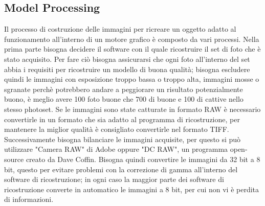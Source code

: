 \documentclass[12pt]{report}
\begin{document}
\newpage
\subsection{Model Processing}
Il processo di costruzione delle immagini per ricreare un oggetto adatto al funzionamento all'interno di un motore grafico  \`e composto da vari processi.
Nella prima parte bisogna decidere il software con il quale ricostruire il set di foto che  \`e stato acquisito. Per fare ci\`o bisogna assicurarsi che ogni foto all'interno del set abbia i requisiti per ricostruire un modello di buona qualit\`a; bisogna escludere quindi le immagini con esposizione troppo bassa o troppo alta, immagini mosse o sgranate perch\`e potrebbero andare a peggiorare un risultato potenzialmente buono, \`e meglio avere 100 foto buone che  700 di buone e 100 di cattive nello stesso photoset.
Se le immagini sono state catturate in formato RAW \`e necessario convertirle in un formato che sia adatto al programma di ricostruzione, per mantenere la miglior qualit\`a \`e consigliato convertirle nel formato TIFF.
\newline
\newline
Successivamente bisogna bilanciare le immagini acquisite, per questo si pu\`o utilizzare "Camera RAW" di Adobe oppure "DC RAW", un programma open-source creato da Dave Coffin.
\newline
\newline
Bisogna quindi convertire le immagini da 32 bit a 8 bit, questo per evitare problemi con la correzione di gamma all'interno del software di ricostruzione; in ogni caso la maggior parte dei software di ricostruzione converte in automatico le immagini a 8 bit, per cui non vi \`e perdita di informazioni.
\newline
\newline

\end{document}
